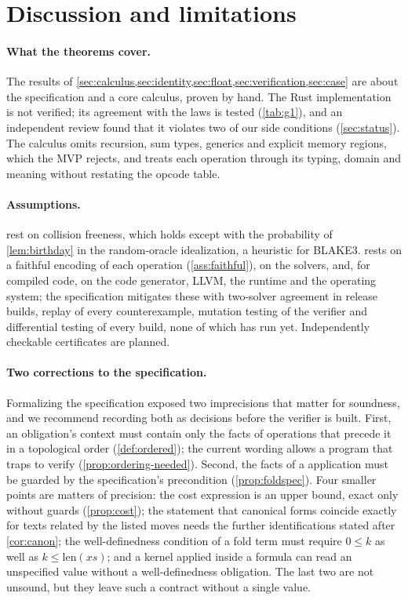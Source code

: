 \section{Discussion and limitations}\label{sec:discussion}

\paragraph{What the theorems cover.}
The results of \cref{sec:calculus,sec:identity,sec:float,sec:verification,sec:case} are about
the specification and a core calculus, proven by hand. The Rust implementation is not verified;
its agreement with the laws is tested (\cref{tab:g1}), and an independent review found that it
violates two of our side conditions (\cref{sec:status}). The calculus omits recursion, sum
types, generics and explicit memory regions, which the MVP rejects, and treats each operation
through its typing, domain and meaning without restating the opcode table.

\paragraph{Assumptions.}
 rest on collision freeness, which
holds except with the probability of \cref{lem:birthday} in the random-oracle idealization, a
heuristic for BLAKE3.  rests on a faithful encoding of each operation
(\cref{ass:faithful}), on the solvers, and, for compiled code, on the code generator, LLVM, the
runtime and the operating system; the specification mitigates these with two-solver agreement
in release builds, replay of every counterexample, mutation testing of the verifier and
differential testing of every build, none of which has run yet. Independently checkable
certificates are planned.

\paragraph{Two corrections to the specification.}
Formalizing the specification exposed two imprecisions that matter for soundness, and we
recommend recording both as decisions before the verifier is built. First, an obligation's
context must contain only the facts of operations that precede it in a topological order
(\cref{def:ordered}); the current wording allows a program that traps to verify
(\cref{prop:ordering-needed}). Second, the facts of a  application must be guarded by
the specification's precondition (\cref{prop:foldspec}). Four smaller points are matters of
precision: the cost expression is an upper bound, exact only without guards
(\cref{prop:cost}); the statement that canonical forms coincide exactly for texts related by the
listed moves needs the further identifications stated after \cref{cor:canon}; the
well-definedness condition of a fold term must require $0\le k$ as well as
$k\le\mathrm{len}(xs)$; and a kernel applied inside a formula can read an unspecified value
without a well-definedness obligation. The last two are not unsound, but they leave such a
contract without a single value.

